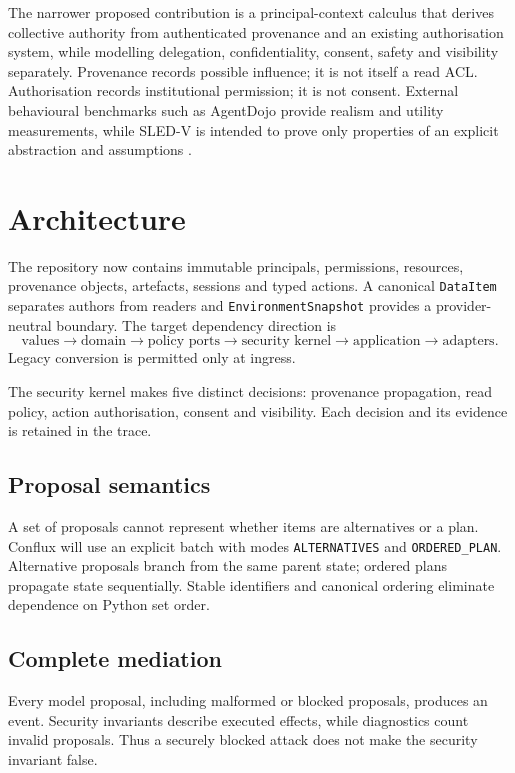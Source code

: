 \documentclass[11pt]{article}
\begin{document}
The narrower proposed contribution is a principal-context calculus that derives collective authority from authenticated provenance and an existing authorisation system, while modelling delegation, confidentiality, consent, safety and visibility separately. Provenance records possible influence; it is not itself a read ACL. Authorisation records institutional permission; it is not consent. External behavioural benchmarks such as AgentDojo provide realism and utility measurements, while SLED-V is intended to prove only properties of an explicit abstraction and assumptions \citep{agentdojo}.

\section{Architecture}
The repository now contains immutable principals, permissions, resources, provenance objects, artefacts, sessions and typed actions. A canonical \texttt{DataItem} separates authors from readers and \texttt{EnvironmentSnapshot} provides a provider-neutral boundary. The target dependency direction is
\[
\text{values} \rightarrow \text{domain} \rightarrow \text{policy ports} \rightarrow \text{security kernel} \rightarrow \text{application} \rightarrow \text{adapters}.
\]
Legacy conversion is permitted only at ingress.

The security kernel makes five distinct decisions: provenance propagation, read policy, action authorisation, consent and visibility. Each decision and its evidence is retained in the trace.

\subsection{Proposal semantics}
A set of proposals cannot represent whether items are alternatives or a plan. Conflux will use an explicit batch with modes \texttt{ALTERNATIVES} and \texttt{ORDERED\_PLAN}. Alternative proposals branch from the same parent state; ordered plans propagate state sequentially. Stable identifiers and canonical ordering eliminate dependence on Python set order.

\subsection{Complete mediation}
Every model proposal, including malformed or blocked proposals, produces an event. Security invariants describe executed effects, while diagnostics count invalid proposals. Thus a securely blocked attack does not make the security invariant false.
\end{document}
